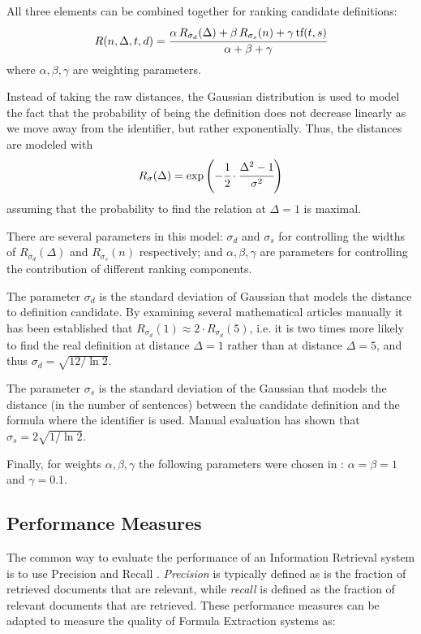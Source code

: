 All three elements can be combined together for ranking candidate definitions:
$$R(n, \Delta, t, d) = \cfrac{\alpha \, R_{\sigma_d}(\Delta) + \beta \, R_{\sigma_s}(n) + \gamma \, \text{tf}(t, s)}{\alpha + \beta + \gamma}$$
where $\alpha, \beta, \gamma$ are weighting parameters.

Instead of taking the raw distances, the Gaussian distribution is used
to model the fact that the probability of being the definition does not
decrease linearly as we move away from the identifier, but rather
exponentially. Thus, the distances are modeled with
$$R_{\sigma}(\Delta) = \exp \left( -\cfrac{1}{2} \cdot \cfrac{\Delta^2 - 1}{\sigma^2} \right)$$
assuming that the probability to find the relation at $\Delta = 1$ is maximal. 

There are several parameters in this model: $\sigma_d$ and $\sigma_s$
for controlling the widths of $R_{\sigma_d}(\Delta)$ and $R_{\sigma_s}(n)$
respectively; and  $\alpha, \beta, \gamma$  are parameters for controlling 
the contribution of different ranking components. 

The parameter $\sigma_d$ is the standard deviation of Gaussian that
models the distance to definition candidate. By examining several mathematical
articles manually it has been established that 
$R_{\sigma_d}(1) \approx 2 \cdot R_{\sigma_d}(5)$, i.e. it is two times more 
likely to find the real definition at distance  $\Delta=1$
rather than at distance $\Delta=5$, and thus $\sigma_d = \sqrt{ 12 / \ln 2}$.

The parameter $\sigma_s$ is the standard deviation of the Gaussian that models 
the distance (in the number of sentences) between the candidate definition 
and the formula where the identifier is used. Manual evaluation has shown that 
$\sigma_s = 2 \sqrt{ 1 / \ln 2}$. 

Finally, for weights $\alpha, \beta, \gamma$ the following parameters were chosen in 
\cite{pagael2014mlp}: $\alpha = \beta = 1$ and $\gamma = 0.1$.


\subsection{Performance Measures} \label{sec:definition-evaluation}

The common way to evaluate the performance of an Information Retrieval system
is to use Precision and Recall \cite{manning2008introduction}. 
\emph{Precision} is typically defined as is the fraction of retrieved documents 
that are relevant, while \emph{recall} is defined as 
the fraction of relevant documents that are retrieved. These performance measures 
can be adapted to measure the quality of Formula Extraction systems \cite{pagael2014mlp} 
as:

